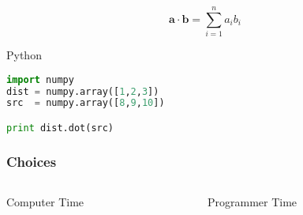 \documentclass[xcolor=table,10pt,final]{beamer}
\begin{document}
\begin{frame}[fragile]
  \frametitle{} %
  {\scriptsize
  \begin{equation*}
    \mathbf{a}\cdot\mathbf{b} = \sum_{i=1}^{n}a_ib_i
  \end{equation*}
}
\lstset{
      basicstyle=\footnotesize
    }
  \begin{block}{Python}
    \begin{lstlisting}[language=Python]
import numpy
dist = numpy.array([1,2,3])
src  = numpy.array([8,9,10])

print dist.dot(src)
\end{lstlisting}
\end{block}
\end{frame}

\begin{frame}
  \frametitle{Choices}
  \begin{columns}[c]
    \begin{column}{0.4\paperwidth}
      \begin{block}{Computer Time}
      \end{block}
    \end{column}
    \begin{column}{0.4\paperwidth}
      \begin{block}{Programmer Time}
      \end{block}
    \end{column}
  \end{columns}
\end{frame}
\end{document}
